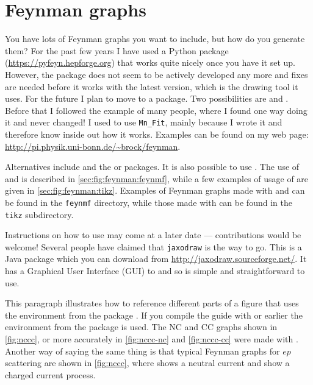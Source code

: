 \section{Feynman graphs}%
\label{sec:fig:feynman}

You have lots of Feynman graphs you want to include, but how do you
generate them? 
For the past few years I have used a Python package  (\url{https://pyfeyn.hepforge.org})
that works quite nicely once you have it set up.
However, the package does not seem to be actively developed any more
and fixes are needed before it works with the latest  version,
which is the drawing tool it uses.
For the future I plan to move to a \TikZ package.
Two possibilities are  and .
Before that I followed the example of many people,
where I found one way doing it and never changed!
I used to use \texttt{Mn\_Fit},
mainly because I wrote it and therefore know inside out how it works.
Examples can be found on my web page:
\url{http://pi.physik.uni-bonn.de/~brock/feynman}.

Alternatives include  and the  or
 packages.
It is also possible to use .
The use of  and  is
described in \cref{sec:fig:feynman:feynmf}, while a few
examples of usage of  are given in
\cref{sec:fig:feynman:tikz}. Examples of Feynman graphs made
with  and  can be found in the
\texttt{feynmf} directory, while those made with  can
be found in the \texttt{tikz} subdirectory.

Instructions on how to use  may come at a later
date --- contributions would be welcome! Several people have claimed
that \texttt{jaxodraw} is the way to go. This is a Java package which
you can download from \url{http://jaxodraw.sourceforge.net/}. It has
a Graphical User Interface (GUI) to  and so is simple and
straightforward to use.

This paragraph illustrates how to reference different parts of a
figure that uses the environment  from the package .
If you compile the guide with  or earlier the
environment  from the package  is used.
The NC and CC graphs shown in
\cref{fig:nccc}, or more accurately in \cref{fig:nccc-nc} and
\cref{fig:nccc-cc} were made with . Another way of
saying the same thing is that typical Feynman graphs for \(ep\)
scattering are shown in \cref{fig:nccc}, where
 shows a neutral current and 
show a charged current process.


